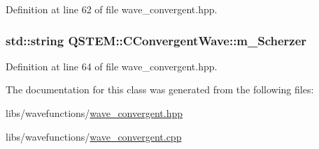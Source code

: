 Definition at line 62 of file wave\-\_\-convergent.\-hpp.

\hypertarget{class_q_s_t_e_m_1_1_c_convergent_wave_a8aa7b347beecd5110fa5dad3df0217a3}{
\subsubsection[{m\-\_\-\-Scherzer}]{\setlength{\rightskip}{0pt plus 5cm}std\-::string Q\-S\-T\-E\-M\-::\-C\-Convergent\-Wave\-::m\-\_\-\-Scherzer\hspace{0.3cm}{\ttfamily [protected]}}}\label{class_q_s_t_e_m_1_1_c_convergent_wave_a8aa7b347beecd5110fa5dad3df0217a3}


Definition at line 64 of file wave\-\_\-convergent.\-hpp.



The documentation for this class was generated from the following files\-:\begin{DoxyCompactItemize}
\item 
libs/wavefunctions/\hyperlink{wave__convergent_8hpp}{wave\-\_\-convergent.\-hpp}\item 
libs/wavefunctions/\hyperlink{wave__convergent_8cpp}{wave\-\_\-convergent.\-cpp}\end{DoxyCompactItemize}
